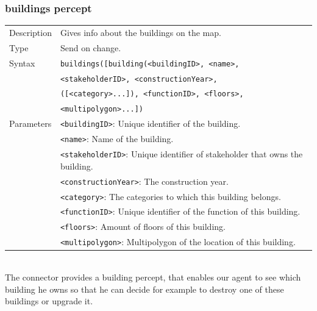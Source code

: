 	\subsubsection*{buildings percept}
		\begin{small}
			\begin{tabular}{p{2cm}p{9cm}}
				Description 	& Gives info about the buildings on the map.\\
				Type 		& Send on change.\\
				Syntax 	& \verb|buildings([building(<buildingID>, <name>, |\\
					 	& \verb|<stakeholderID>, <constructionYear>, |\\
					 	& \verb|([<category>...]), <functionID>, <floors>, |\\
					 	& \verb|<multipolygon>...]) |\\
				Parameters 	& \verb|<buildingID>|: Unique identifier of the building.\\
						& \verb|<name>|: Name of the building.\\
						& \verb|<stakeholderID>|:  Unique identifier of stakeholder that owns the building.\\
						& \verb|<constructionYear>|: The construction year.\\
						& \verb|<category>|: The categories to which this building belongs.\\
						& \verb|<functionID>|: Unique identifier of the function of this building.\\
						& \verb|<floors>|: Amount of floors of this building.\\
						& \verb|<multipolygon>|: Multipolygon of the location of this building.\\
			\end{tabular}
		\end{small}
	\\The connector provides a building percept, that enables our agent to see which building he owns so that he can decide for example to destroy one of these buildings or upgrade it.

